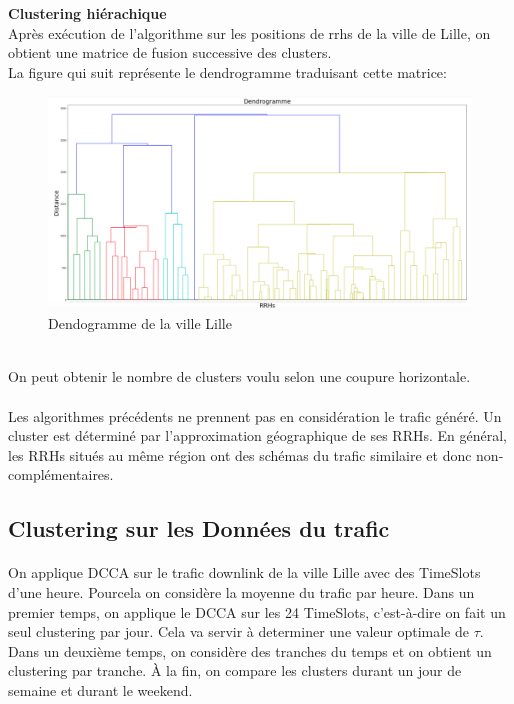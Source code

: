 \documentclass{report}
\begin{document}
\textbf{Clustering hiérachique}\\
Après exécution de l’algorithme sur les positions de rrhs de la ville de Lille, on obtient une matrice
de fusion successive des clusters.\\
La figure qui suit représente le dendrogramme traduisant cette matrice:
\begin{figure}[h]
  \centering
  \includegraphics[width=40em]{images/dendogramme.png}
  \caption{Dendogramme de la ville Lille }
\end{figure}\\
On peut obtenir le nombre de clusters voulu selon une coupure horizontale. 
\paragraph{}
Les algorithmes précédents ne prennent pas en considération le trafic généré. Un cluster est déterminé par l'approximation géographique 
de ses RRHs. En général, les RRHs situés au même région ont des schémas du trafic similaire et donc non-complémentaires. 
\subsection{Clustering sur les Données du trafic}
\paragraph{}
On applique DCCA sur le trafic downlink de la ville Lille avec des TimeSlots d'une heure. Pourcela on considère la moyenne du trafic par heure.
Dans un premier temps, on applique le DCCA sur les 24 TimeSlots, c'est-à-dire on fait un seul clustering par jour. Cela va servir à determiner
une valeur optimale de $\tau$. Dans un deuxième temps, on considère des tranches du temps et on obtient un clustering par tranche. 
À la fin, on compare les clusters durant un jour de semaine et durant le weekend.
\end{document}
